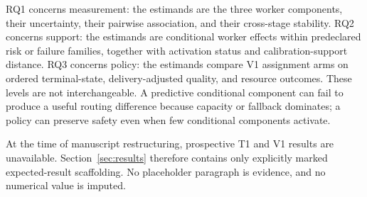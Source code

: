 RQ1 concerns measurement: the estimands are the three worker components, their uncertainty, their pairwise association, and their cross-stage stability. RQ2 concerns support: the estimands are conditional worker effects within predeclared risk or failure families, together with activation status and calibration-support distance. RQ3 concerns policy: the estimands compare V1 assignment arms on ordered terminal-state, delivery-adjusted quality, and resource outcomes. These levels are not interchangeable. A predictive conditional component can fail to produce a useful routing difference because capacity or fallback dominates; a policy can preserve safety even when few conditional components activate.

At the time of manuscript restructuring, prospective T1 and V1 results are unavailable. Section~\ref{sec:results} therefore contains only explicitly marked expected-result scaffolding. No placeholder paragraph is evidence, and no numerical value is imputed.
